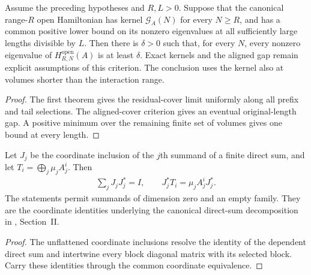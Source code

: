 \begin{lemma}
    \label{thm:all_length_gap_primitive_resolution_criterion}
    \leanok
    Assume the preceding hypotheses and $R,L>0$. Suppose that the
    canonical range-$R$ open Hamiltonian has kernel $\mathcal G_A(N)$
    for every $N\ge R$, and has a common positive lower bound on its
    nonzero eigenvalues at all sufficiently large lengths divisible by $L$.
    Then there is $\delta>0$ such that, for every $N$, every nonzero
    eigenvalue of $H_{R,N}^{\mathrm{open}}(A)$ is at least $\delta$.
    Exact kernels and the aligned gap remain explicit assumptions of
    this criterion. The conclusion uses the kernel also at
    volumes shorter than the interaction range.
\end{lemma}
\begin{proof}\leanok
    The first theorem gives the residual-cover limit uniformly along
    all prefix and tail selections. The aligned-cover criterion gives
    an eventual original-length gap. A positive minimum over the
    remaining finite set of volumes gives one bound at every length.
\end{proof}

\begin{lemma}
    \label{thm:block_inclusion_coordinate_resolution}
    \leanok
    Let $J_j$ be the coordinate inclusion of the $j$th summand of a finite
    direct sum, and let $T_i=\bigoplus_j\mu_j A_j^i$. Then
    \begin{align}
        \sum_jJ_jJ_j^*=I,\qquad J_j^*T_i=\mu_jA_j^iJ_j^*.
    \end{align}
    The statements permit summands of dimension zero and an empty family.
    They are the coordinate identities underlying the canonical direct-sum
    decomposition in \cite{Cirac2016MPDO_arXiv}, Section~II.
\end{lemma}
\begin{proof}\leanok
    The unflattened coordinate inclusions resolve the identity of the dependent
    direct sum and intertwine every block diagonal matrix with its selected
    block. Carry these identities through the common coordinate equivalence.
\end{proof}

